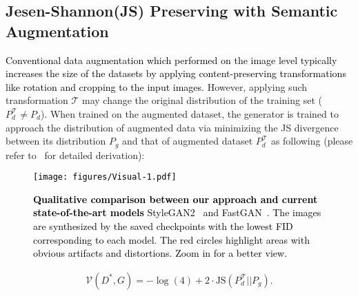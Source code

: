 \documentclass[10pt,journal,compsoc]{IEEEtran}
\newcommand{\revise}[1]{\textcolor{black}{#1}}
\begin{document}
\subsection{Jesen-Shannon(JS) Preserving with Semantic Augmentation}
%
\revise{Conventional data augmentation which performed on the image level typically increases the size of the datasets by applying content-preserving transformations like rotation and cropping to the input images.}
%
However, applying such transformation $\mathcal{T}$ may change the original distribution of the training set ($P_{d}^{\mathcal{T}} \neq P_{d} $).
%
When trained on the augmented dataset, the generator is trained to approach the distribution of augmented data via minimizing the JS divergence between its distribution $P_{g}$ and that of augmented dataset $P_{d}^{\mathcal{T}}$ as following (please refer to~\cite{goodfellow2014generative} for detailed derivation):

\revise{
\begin{figure*}
  \centering
  \texttt{[image: figures/Visual-1.pdf]}
  \caption{\revise{
  \textbf{Qualitative comparison between our approach and current state-of-the-art models} StyleGAN2~\cite{karras2020analyzing} and FastGAN~\cite{liu2021towards}. The images are synthesized by the saved checkpoints with the lowest FID corresponding to each model.
    The red circles highlight areas with obvious artifacts and distortions.
    Zoom in for a better view.
  }
  }
  \label{VisAll}
  \vspace{-5mm}
\end{figure*}
}

\vspace{-3mm}
\begin{equation}
\begin{aligned}
\label{JS}
\mathcal{V}\left(D^{*}, G\right)=-\log (4)+2 \cdot \mathrm{JS}\left(P_{d}^{\mathcal{T}} || P_{g}\right).
\end{aligned}
\end{equation}
\vspace{-4mm}
\end{document}
